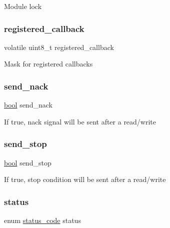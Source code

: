Module lock \mbox{\label{structi2c__master__module_a9b4084f9afb73a1aa2f9a81a197f8ce6}} 
\subsubsection{\texorpdfstring{registered\_callback}{registered\_callback}}
{\footnotesize\ttfamily volatile uint8\+\_\+t registered\+\_\+callback}

Mask for registered callbacks \mbox{\label{structi2c__master__module_a3c279135c200db1548149c965157e0a4}} 
\subsubsection{\texorpdfstring{send\_nack}{send\_nack}}
{\footnotesize\ttfamily \mbox{\hyperlink{group__group__sam0__utils_ga97a80ca1602ebf2303258971a2c938e2}{bool}} send\+\_\+nack}

If true, nack signal will be sent after a read/write \mbox{\label{structi2c__master__module_a1857be51e54274600320a6dd851f341f}} 
\subsubsection{\texorpdfstring{send\_stop}{send\_stop}}
{\footnotesize\ttfamily \mbox{\hyperlink{group__group__sam0__utils_ga97a80ca1602ebf2303258971a2c938e2}{bool}} send\+\_\+stop}

If true, stop condition will be sent after a read/write \mbox{\label{structi2c__master__module_a30c0453c8af1896546c1ab0142be3181}} 
\subsubsection{\texorpdfstring{status}{status}}
{\footnotesize\ttfamily enum \mbox{\hyperlink{group__group__sam0__utils__status__codes_ga751c892e5a46b8e7d282085a5a5bf151}{status\+\_\+code}} status}

